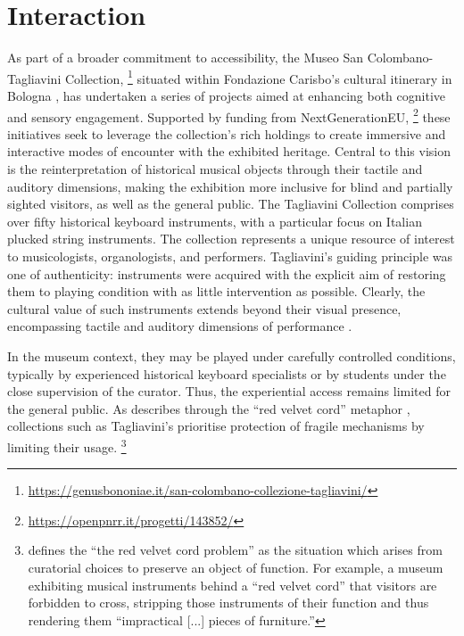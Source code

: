 \chapter{Interaction}\label{ch:interaction}

As part of a broader commitment to accessibility, the Museo San Colombano-Tagliavini Collection,
\footnote{\url{https://genusbononiae.it/san-colombano-collezione-tagliavini/}}
situated within Fondazione Carisbo's cultural itinerary in Bologna \cite{meer_collezione_2007}, has undertaken a series of projects aimed at enhancing both cognitive and sensory engagement. Supported by funding from NextGenerationEU,%
\footnote{\url{https://openpnrr.it/progetti/143852/}}
these initiatives seek to leverage the collection’s rich holdings to create immersive and interactive modes of encounter with the exhibited heritage. Central to this vision is the reinterpretation of historical musical objects through their tactile and auditory dimensions, making the exhibition more inclusive for blind and partially sighted visitors, as well as the general public. The Tagliavini Collection comprises over fifty historical keyboard instruments, with a particular focus on Italian plucked string instruments. The collection represents a unique resource of interest to musicologists, organologists, and performers. Tagliavini's guiding principle was one of authenticity: instruments were acquired with the explicit aim of restoring them to playing condition with as little intervention as possible. Clearly, the cultural value of such instruments extends beyond their visual presence, 
encompassing tactile and auditory dimensions of performance \cite{fritz_listener_2017}. 

In the museum context, they may be played under carefully controlled conditions, typically by experienced historical keyboard specialists or by students under the close supervision of the curator. Thus, the experiential access remains limited for the general public. As \citeauthor{mcalpine_sampling_2014} describes through the ``red velvet cord'' metaphor \cite{mcalpine_sampling_2014},
collections such as Tagliavini's prioritise protection of fragile mechanisms by limiting their usage.  
\footnote{\textcite{mcalpine_sampling_2014} defines the ``the red velvet cord problem'' as the situation which arises from curatorial choices to preserve an object of function. For example, a museum exhibiting musical instruments behind a ``red velvet cord'' that visitors are forbidden to cross, stripping those instruments of their function and thus rendering them ``impractical [...] pieces of furniture.''}



